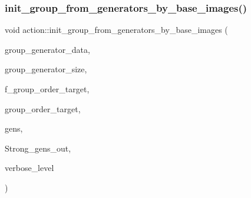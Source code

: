 \mbox{\label{classaction_a4e5304907b6de4cdd1dc77bf7015b2cf}} 
\subsubsection{\texorpdfstring{init\+\_\+group\+\_\+from\+\_\+generators\+\_\+by\+\_\+base\+\_\+images()}{init\_group\_from\_generators\_by\_base\_images()}}
{\footnotesize\ttfamily void action\+::init\+\_\+group\+\_\+from\+\_\+generators\+\_\+by\+\_\+base\+\_\+images (\begin{DoxyParamCaption}\item[{\mbox{\hyperlink{galois_8h_a09fddde158a3a20bd2dcadb609de11dc}{I\+NT}} $\ast$}]{group\+\_\+generator\+\_\+data,  }\item[{\mbox{\hyperlink{galois_8h_a09fddde158a3a20bd2dcadb609de11dc}{I\+NT}}}]{group\+\_\+generator\+\_\+size,  }\item[{\mbox{\hyperlink{galois_8h_a09fddde158a3a20bd2dcadb609de11dc}{I\+NT}}}]{f\+\_\+group\+\_\+order\+\_\+target,  }\item[{const \mbox{\hyperlink{galois_8h_ab6cc7b4aeb6ea31aba2b3fbfc83ff5e6}{B\+Y\+TE}} $\ast$}]{group\+\_\+order\+\_\+target,  }\item[{\mbox{\hyperlink{classvector__ge}{vector\+\_\+ge}} $\ast$}]{gens,  }\item[{\mbox{\hyperlink{classstrong__generators}{strong\+\_\+generators}} $\ast$\&}]{Strong\+\_\+gens\+\_\+out,  }\item[{\mbox{\hyperlink{galois_8h_a09fddde158a3a20bd2dcadb609de11dc}{I\+NT}}}]{verbose\+\_\+level }\end{DoxyParamCaption})}

\mbox{\label{classaction_a006f1d65defecfef78e4130c0facc501}} 
